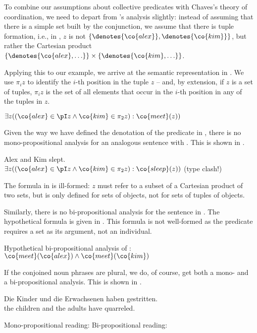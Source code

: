 \documentclass[output=paper]{langsci/langscibook}
\begin{document}
To combine our assumptions about collective predicates with Chaves's theory of coordination, 
we need to depart from \citeauthor{Chaves:07}'s analysis slightly: instead of assuming that there is a simple set built by the conjunction, we assume that there is tuple formation, i.e., in , $z$ is not  $\{\denotes{\co{alex}}, \denotes{\co{kim}}\}$,
but rather the Cartesian product
$\{ \denotes{\co{alex}, \ldots} \} \times \{\denotes{\co{kim}, \ldots} \}$.%

Applying this to our example, we arrive at the semantic representation in . 
We use $\pi_i z$ to identify the $i$-th position in the tuple $z$ -- and, by extension, if $z$ is a set of tuples, $\pi_i z$ is the set of all elements that occur in the $i$-th position in any of the tuples in $z$.

\ea \label{AlexKimTalk-sum}
$\exists z 
((\co{alex} \in \pI z
\land \co{kim} \in \pi_2 z)
: \co{meet}(z))$
\z

Given the way we have defined the denotation of the predicate  in , there is no mono-propositional analysis for an analogous sentence with . 
This is shown in .

\ea \label{AlexKimSleep-sum}
Alex and Kim slept.\\
$\exists z 
((\co{alex} \in \pI z
\land \co{kim} \in \pi_2 z)
: \co{sleep}(z))$
\hspace*{\fill}(type clash!)
\z 

The formula in  is ill-formed: $z$ must refer to a subset of a Cartesian product of two sets, but  is only defined for sets of objects, not for sets of tuples of objects.

Similarly, there is no bi-propositional analysis for the sentence in .
The hypothetical formula is given in .
This formula is not well-formed as the predicate  requires a set as its argument, not an individual.

\ea \label{AlexKimTalk-bi}
Hypothetical bi-propositional analysis of :\\
$\co{meet}(\co{alex}) \land
\co{meet}(\co{kim})
$
\z 

If the conjoined noun phrases are plural, we do, of course, get both a mono- and a bi-propositional analysis. This is shown in .

\ea \label{ex-kinder-erw-streit}
\gll Die Kinder und die Erwachsenen haben gestritten.\\
the children and the adults have quarreled.\\
\begin{xlist}
\ex 
 Mono-propositional reading: 
\ex  Bi-propositional reading: 
\end{xlist}
\z 
\end{document}
